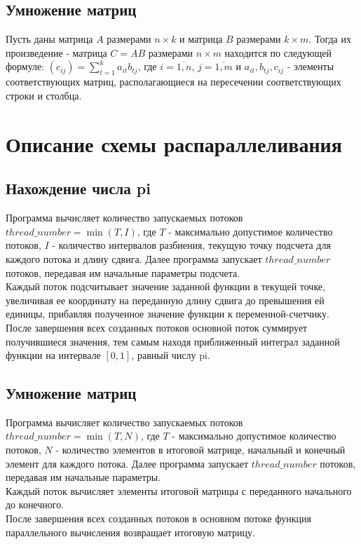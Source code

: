 \documentclass{report}
\begin{document}
\subsection*{Умножение матриц}
\par Пусть даны матрица \( A \) размерами \( n \times k \) и матрица \( B \) размерами \( k \times m \). Тогда их произведение - матрица \( C = A B \) размерами \( n \times m \) находится по следующей формуле: \( (c_{ij}) = \sum\limits_{t = 1}^{k} a_{it} b_{tj} \), где \( i = \overline{1,n} \), \( j = \overline{1,m} \) и \( a_{it}, b_{tj}, c_{ij} \) - элементы соответствующих матриц, располагающиеся на пересечении соответствующих строки и столбца.
\clearpage

\section*{Описание схемы распараллеливания}
\subsection*{Нахождение числа pi}
\par Программа вычисляет количество запускаемых потоков \( thread\_number = \min (T, I) \), где \( T \) - максимально допустимое количество потоков, \( I \) - количество интервалов разбиения, текущую точку подсчета для каждого потока и длину сдвига. Далее программа запускает \( thread\_number \) потоков, передавая им начальные параметры подсчета.\\
Каждый поток подсчитывает значение заданной функции в текущей точке, увеличивая ее координату на переданную длину сдвига до превышения ей единицы, прибавляя полученное значение функции к переменной-счетчику.\\
После завершения всех созданных потоков основной поток суммирует получившиеся значения, тем самым находя приближенный интеграл заданной функции на интервале \( [0, 1] \), равный числу pi.
\subsection*{Умножение матриц}
\par Программа вычисляет количество запускаемых потоков \( thread\_number = \min (T, N) \), где \( T \) - максимально допустимое количество потоков, \( N \) - количество элементов в итоговой матрице, начальный и конечный элемент для каждого потока. Далее программа запускает \( thread\_number \) потоков, передавая им начальные параметры.\\
Каждый поток вычисляет элементы итоговой матрицы с переданного начального до конечного.\\
После завершения всех созданных потоков в основном потоке функция параллельного вычисления возвращает итоговую матрицу.
\clearpage
\end{document}
